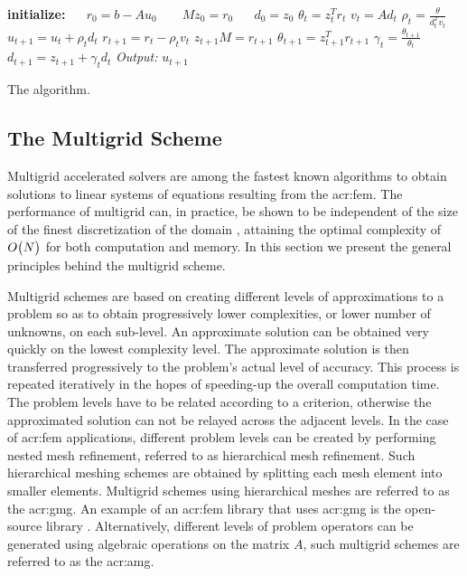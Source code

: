 \begin{algorithm}
	\begin{algorithmic}[1]
		\STATE \textbf{initialize:}
		\STATE ~ ~$r_0 = b - Au_0$
		\STATE ~ ~ $M z_0  = r_0$
		\STATE ~ ~$d_0 = z_0$
		\REPEAT[Iterate $t=1,2,\cdots$]
		\STATE $\theta_t = z_t^Tr_t$
		\STATE $v_t = Ad_t$ \label{alg:smvmLine}
		\STATE $\rho_t = \frac{\theta}{d_t^Tv_t}$
		\STATE $u_{t+1} = u_t + \rho_t d_t$
		\STATE $r_{t+1} = r_t - \rho_t v_t$
		\STATE {} $z_{t+1} M = r_{t+1}$ \label{alg:precLine}
		\STATE $\theta_{t+1} = z_{t+1}^Tr_{t+1}$
		\STATE $ \gamma_t = \frac{\theta_{t+1}}{\theta_t}$
		\STATE $d_{t+1} = z_{t+1} + \gamma_t d_t $
		\STATE \textit{Output:} $u_{t+1}$
	\end{algorithmic}
	\caption[The \acrshort{acr:pcg} algorithm.]{The  algorithm.}
	\label{alg:pcg}
\end{algorithm}



\subsection{The Multigrid Scheme}
\label{sec:RMG}

Multigrid accelerated solvers \cite{bib:Briggs2000AMT,bib:Trottenberg2001M,bib:multigridZhu2006} are among the fastest known algorithms to obtain solutions to linear systems of equations resulting from the \gls{acr:fem}.
The performance of multigrid can, in practice, be shown to be independent of the size of the finest discretization of the domain \cite{bib:Briggs2000AMT,bib:Trottenberg2001M}, attaining the optimal complexity of $ O\bigl(N\bigr)$ for both computation and memory.
In this section we present the general principles behind the multigrid scheme.


Multigrid schemes are based on creating different levels of approximations to a problem so as to obtain progressively lower complexities, or lower number of unknowns, on each sub-level.
An approximate solution can be obtained very quickly on the lowest complexity level.
The approximate solution is then transferred progressively to the problem's actual level of accuracy.
This process is repeated iteratively in the hopes of speeding-up the overall computation time.
The problem levels have to be related according to a criterion, otherwise the approximated solution can not be relayed across the adjacent levels.
In the case of \gls{acr:fem} applications, different problem levels can be created by performing nested mesh refinement, referred to as hierarchical mesh refinement.
Such hierarchical meshing schemes are obtained by splitting each mesh element into smaller elements.
Multigrid schemes using hierarchical meshes are referred to as the \gls{acr:gmg}.
An example of an \gls{acr:fem} library that uses \gls{acr:gmg} is the open-source library \dealName{} \cite{bib:dealii2007}.
Alternatively, different levels of problem operators can be generated using algebraic operations on the matrix $A$, such multigrid schemes are referred to as the \gls{acr:amg}.


